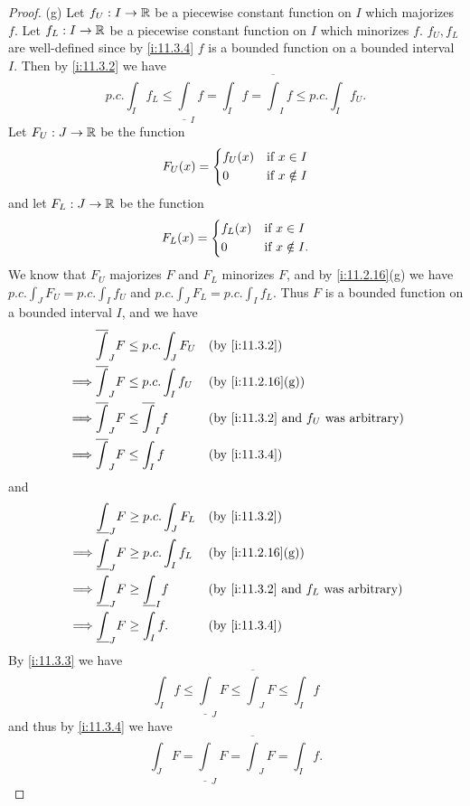 \begin{proof}{(g)}
  Let \(f_U : I \to \mathbb{R}\) be a piecewise constant function on \(I\) which majorizes \(f\).
  Let \(f_L : I \to \mathbb{R}\) be a piecewise constant function on \(I\) which minorizes \(f\).
  \(f_U, f_L\) are well-defined since by \cref{i:11.3.4} \(f\) is a bounded function on a bounded interval \(I\).
  Then by \cref{i:11.3.2} we have
  \[
    p.c. \int_I f_L \leq \underline{\int}_I f = \int_I f = \overline{\int}_I f \leq p.c. \int_I f_U.
  \]
  Let \(F_U : J \to \mathbb{R}\) be the function
  \[
    F_U(x) = \begin{dcases}
      f_U(x) & \text{if } x \in I    \\
      0      & \text{if } x \notin I
    \end{dcases}
  \]
  and let \(F_L : J \to \mathbb{R}\) be the function
  \[
    F_L(x) = \begin{dcases}
      f_L(x) & \text{if } x \in I     \\
      0      & \text{if } x \notin I.
    \end{dcases}
  \]
  We know that \(F_U\) majorizes \(F\) and \(F_L\) minorizes \(F\), and by \cref{i:11.2.16}(g) we have \(p.c. \int_J F_U = p.c. \int_I f_U\) and \(p.c. \int_J F_L = p.c. \int_I f_L\).
  Thus \(F\) is a bounded function on a bounded interval \(I\), and we have
  \begin{align*}
             & \overline{\int}_J F \leq p.c. \int_J F_U     &  & \by{i:11.3.2}                                         \\
    \implies & \overline{\int}_J F \leq p.c. \int_I f_U     &  & \by{i:11.2.16}[g]                                     \\
    \implies & \overline{\int}_J F \leq \overline{\int}_I f &  & \text{(by \cref{i:11.3.2} and \(f_U\) was arbitrary)} \\
    \implies & \overline{\int}_J F \leq \int_I f            &  & \by{i:11.3.4}
  \end{align*}
  and
  \begin{align*}
             & \underline{\int}_J F \geq p.c. \int_J F_L      &  & \by{i:11.3.2}                                         \\
    \implies & \underline{\int}_J F \geq p.c. \int_I f_L      &  & \by{i:11.2.16}[g]                                     \\
    \implies & \underline{\int}_J F \geq \underline{\int}_I f &  & \text{(by \cref{i:11.3.2} and \(f_L\) was arbitrary)} \\
    \implies & \underline{\int}_J F \geq \int_I f.            &  & \by{i:11.3.4}
  \end{align*}
  By \cref{i:11.3.3} we have
  \[
    \int_I f \leq \underline{\int}_J F \leq \overline{\int}_J F \leq \int_I f
  \]
  and thus by \cref{i:11.3.4} we have
  \[
    \int_J F = \underline{\int}_J F = \overline{\int}_J F = \int_I f.
  \]
\end{proof}

